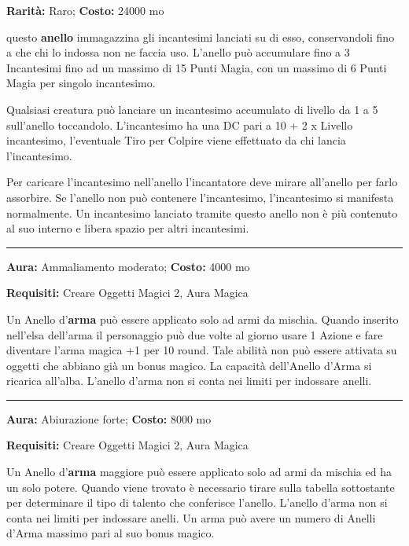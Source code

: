 \begin{multicols}{2}
\textbf{Rarità:} Raro; \textbf{Costo:} 24000 mo

questo \textbf{anello} immagazzina gli incantesimi lanciati su di esso, conservandoli fino a che chi lo indossa non ne faccia uso. L'anello può accumulare fino a 3 Incantesimi fino ad un massimo di 15 Punti Magia, con un massimo di 6 Punti Magia per singolo incantesimo.

Qualsiasi creatura può lanciare un incantesimo accumulato di livello da 1 a 5 sull'anello toccandolo. L'incantesimo ha una DC pari a 10 + 2 x Livello incantesimo, l'eventuale Tiro per Colpire viene effettuato da chi lancia l'incantesimo.

Per caricare l'incantesimo nell'anello l'incantatore deve mirare all'anello per farlo assorbire. Se l'anello non può contenere l'incantesimo, l'incantesimo si manifesta normalmente. Un incantesimo lanciato tramite questo anello non è più contenuto al suo interno e libera spazio per altri incantesimi.

\smallskip\noindent\rule{\linewidth}{2pt}  \hypertarget{Anellod'Arma}{}\smallskip{}\noindent\label{Anellod'Arma}

\textbf{Aura:} Ammaliamento moderato; \textbf{Costo:} 4000 mo

\textbf{Requisiti:} Creare Oggetti Magici 2, Aura Magica

Un Anello d'\textbf{arma} può essere applicato solo ad armi da mischia. Quando inserito nell'elsa dell'arma il personaggio può due volte al giorno usare 1 Azione e fare diventare l'arma magica +1 per 10 round. Tale abilità non può essere attivata su oggetti che abbiano già un bonus magico.
La capacità dell'Anello d'Arma si ricarica all'alba. L'anello d'arma non si conta nei limiti per indossare anelli.

\smallskip\noindent\rule{\linewidth}{2pt}  \hypertarget{Anellod'Armamaggiore}{}\smallskip{}\noindent\label{Anellod'Armamaggiore}

\textbf{Aura:} Abiurazione forte; \textbf{Costo:} 8000 mo

\textbf{Requisiti:} Creare Oggetti Magici 2, Aura Magica

Un Anello d'\textbf{arma} maggiore può essere applicato solo ad armi da mischia ed ha un solo potere. Quando viene trovato è necessario tirare sulla tabella sottostante per determinare il tipo di talento che conferisce l'anello. L'anello d'arma non si conta nei limiti per indossare anelli. Un arma può avere un numero di Anelli d'Arma massimo pari al suo bonus magico.


\end{multicols}
